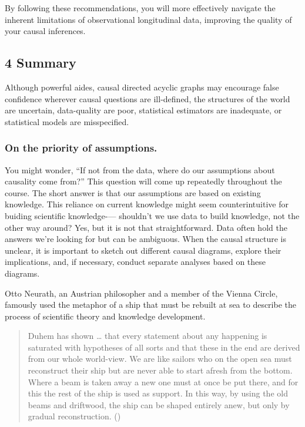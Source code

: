 \documentclass[
  single column]{article}
\begin{document}
By following these recommendations, you will more effectively navigate
the inherent limitations of observational longitudinal data, improving
the quality of your causal inferences.

\subsection{4 Summary}\label{summary}

Although powerful aides, causal directed acyclic graphs may encourage
false confidence wherever causal questions are ill-defined, the
structures of the world are uncertain, data-quality are poor,
statistical estimators are inadequate, or statistical models are
misspecified.

\subsubsection{On the priority of
assumptions.}\label{on-the-priority-of-assumptions.}

You might wonder, ``If not from the data, where do our assumptions about
causality come from?'' This question will come up repeatedly throughout
the course. The short answer is that our assumptions are based on
existing knowledge. This reliance on current knowledge might seem
counterintuitive for buiding scientific knowledge-\/--- shouldn't we use
data to build knowledge, not the other way around? Yes, but it is not
that straightforward. Data often hold the answers we're looking for but
can be ambiguous. When the causal structure is unclear, it is important
to sketch out different causal diagrams, explore their implications,
and, if necessary, conduct separate analyses based on these diagrams.

Otto Neurath, an Austrian philosopher and a member of the Vienna Circle,
famously used the metaphor of a ship that must be rebuilt at sea to
describe the process of scientific theory and knowledge development.

\begin{quote}
Duhem has shown \ldots{} that every statement about any happening is
saturated with hypotheses of all sorts and that these in the end are
derived from our whole world-view. We are like sailors who on the open
sea must reconstruct their ship but are never able to start afresh from
the bottom. Where a beam is taken away a new one must at once be put
there, and for this the rest of the ship is used as support. In this
way, by using the old beams and driftwood, the ship can be shaped
entirely anew, but only by gradual reconstruction.
()
\end{quote}
\end{document}
